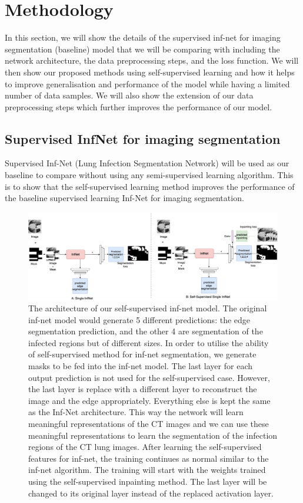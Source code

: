 \section{Methodology}


In this section, we will show the details of the supervised inf-net for imaging segmentation (baseline) model that we will be comparing with including the network architecture, the data preprocessing steps, and the loss function. We will then show our proposed methods using self-supervised learning and how it helps to improve generalisation and performance of the model while having a limited number of data samples. We will also show the extension of our data preprocessing steps which further improves the performance of our model.

\subsection{Supervised InfNet for imaging segmentation}
Supervised Inf-Net	(Lung Infection Segmentation Network) will be used as our baseline \cite{ref14} to compare without using any semi-supervised learning algorithm. This is to show that the self-supervised learning method  improves the performance of the baseline supervised learning Inf-Net for imaging segmentation. 

\begin{figure}
	\centering
	\includegraphics[width=\linewidth]{self-super-inf-net.png}
	\caption{The architecture of our self-supervised inf-net model. The original inf-net model would generate 5 different predictions: the edge segmentation prediction, and the other 4 are segmentation of the infected regions but of different sizes. In order to utilise the ability of self-supervised method for inf-net segmentation, we generate masks to be fed into the inf-net model. The last layer for each output prediction is not used for the self-supervised case. However, the last layer is replace with a different layer to reconstruct the image and the edge appropriately. Everything else is kept the same as the Inf-Net architecture. This way the network will learn meaningful representations of the CT images and we can use these meaningful representations to learn the segmentation of the infection regions of the CT lung images. After learning the self-supervised features for inf-net, the training continues as normal similar to the inf-net algorithm. The training will start with the weights trained using the self-supervised inpainting method. The last layer will be changed to its original layer instead of the replaced activation layer. }
	\label{fig:inf-net_arch}
\end{figure}

